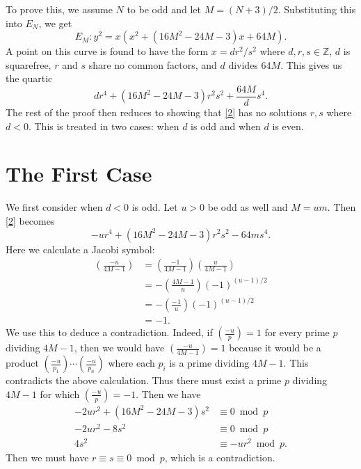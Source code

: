 \documentclass[12pt]{article}
\theoremstyle{definition}
\begin{document}
To prove this, we assume $N$ to be odd and let $M = (N+3)/2$.
Substituting this into $E_N$, we get \begin{equation*}
	E_M : y^2 = x(x^2 + (16M^2 - 24M-3)x + 64M).
\end{equation*}
A point on this curve is found to have the form $x=dr^2/s^2$ where $d, r, s \in \mathbb{Z}$, $d$ is squarefree, $r$ and $s$ share no common factors, and $d$ divides $64M$.
This gives us the quartic \begin{equation}\label{2}
	dr^4 + (16M^2 - 24M - 3)r^2s^2 + \frac{64M}{d}s^4.
\end{equation}
The rest of the proof then reduces to showing that \eqref{2} has no solutions $r, s$ where $d < 0$.
This is treated in two cases: when $d$ is odd and when $d$ is even.

\section{The First Case}
We first consider when $d < 0$ is odd.
Let $u > 0$ be odd as well and $M = um$.
Then \eqref{2} becomes \begin{equation*}
	-ur^4 + (16M^2 - 24M - 3)r^2s^2 - 64ms^4.
\end{equation*}
Here we calculate a Jacobi symbol: \begin{align*}
	\left( \frac{-u}{4M-1} \right) & = \left( \frac{-1}{4M-1} \right) \left( \frac{u}{4M-1} \right) \\
	                               & = -\left( \frac{4M-1}{u} \right) (-1)^{(u-1)/2}                \\
	                               & = -\left( \frac{-1}{u} \right)(-1)^{(u-1)/2}                   \\
	                               & = -1.
\end{align*}
We use this to deduce a contradiction.
Indeed, if $\left( \frac{-u}{p} \right) = 1$ for every prime $p$ dividing $4M - 1$, then we would have $\left( \frac{-u}{4M-1} \right) = 1$ because it would be a product $\left( \frac{-u}{p_1} \right)\cdots \left( \frac{-u}{p_n} \right)$ where each $p_i$ is a prime dividing $4M-1$.
This contradicts the above calculation.
Thus there must exist a prime $p$ dividing $4M-1$ for which $\left( \frac{-u}{p} \right) = -1$.
Then we have \begin{align*}
	-2ur^2 + (16M^2 - 24M - 3)s^2 & \equiv 0 \bmod p      \\
	-2ur^2 - 8s^2                 & \equiv 0 \bmod p      \\
	4s^2                          & \equiv -ur^2 \bmod p.
\end{align*}
Then we must have $r \equiv s \equiv 0 \bmod p$, which is a contradiction.
\end{document}
